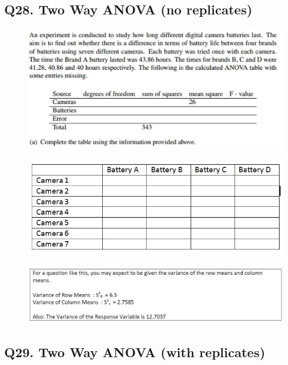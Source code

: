 \documentclass[a4paper,12pt]{article}
\begin{document}
\subsection*{Q28. Two Way ANOVA (no replicates)}
\begin{figure}[h!]
	\centering
	\includegraphics[width=0.9\linewidth]{image/Q28Review1}
	
\end{figure}
\begin{figure}[h!]
	\centering
	\includegraphics[width=0.9\linewidth]{image/Q28Review3}
	
\end{figure}
\begin{figure}[h!]
	\centering
	\includegraphics[width=0.9\linewidth]{image/Q28Review2}
	
\end{figure}
\newpage
\subsection*{Q29. Two Way ANOVA (with replicates)}
\end{document}
